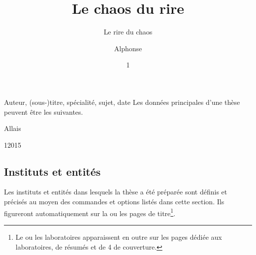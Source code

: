 \begin{dbexample}{Auteur, (sous-)titre, spécialité, sujet, date}{}
  Les données principales d'une thèse peuvent être les suivantes.
  \NoAutoSpacing%
\begin{bodycode}[title=Par exemple dans le \File{\characteristicsfile},listing options={deletekeywords={[2]title}}]
\author[aa@zygo.fr]{Alphonse}{Allais}
\title[Laugh's Chaos]{Le chaos du rire}
\subtitle[Chaos' laugh]{Le rire du chaos}
\date{1}{1}{2015}
\subject{Rire chaotique}
\end{bodycode}
\end{dbexample}

\subsection{Instituts et entités}\label{sec:entites}

Les instituts et entités dans lesquels  la thèse
a été préparée sont définis et précisés au moyen des commandes et options
listés dans cette section. Ils figureront automatiquement sur la ou les pages
de titre\footnote{Le ou les laboratoires apparaissent en outre sur les pages
  dédiée aux laboratoires, de résumés et de 4\ieme{} de couverture.}.

